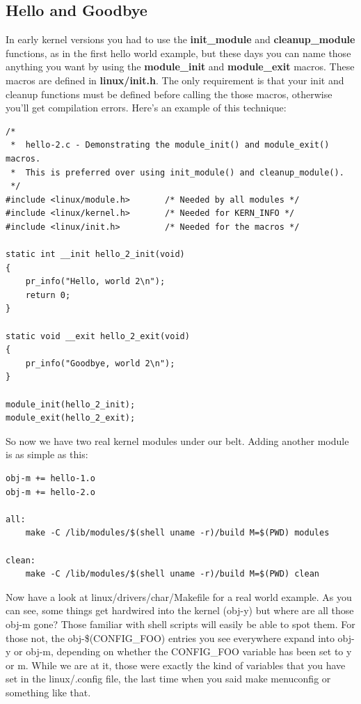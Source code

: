 \documentclass[11pt]{article}
\begin{document}
\subsection*{Hello and Goodbye}
\label{sec-4-2}
In early kernel versions you had to use the \textbf{init\_module} and \textbf{cleanup\_module} functions, as in the first hello world example, but these days you can name those anything you want by using the \textbf{module\_init} and \textbf{module\_exit} macros. These macros are defined in \textbf{linux/init.h}. The only requirement is that your init and cleanup functions must be defined before calling the those macros, otherwise you'll get compilation errors. Here's an example of this technique:

\begin{verbatim}
/*
 *  hello-2.c - Demonstrating the module_init() and module_exit() macros.
 *  This is preferred over using init_module() and cleanup_module().
 */
#include <linux/module.h>       /* Needed by all modules */
#include <linux/kernel.h>       /* Needed for KERN_INFO */
#include <linux/init.h>         /* Needed for the macros */

static int __init hello_2_init(void)
{
    pr_info("Hello, world 2\n");
    return 0;
}

static void __exit hello_2_exit(void)
{
    pr_info("Goodbye, world 2\n");
}

module_init(hello_2_init);
module_exit(hello_2_exit);
\end{verbatim}

So now we have two real kernel modules under our belt. Adding another module is as simple as this:

\begin{verbatim}
obj-m += hello-1.o
obj-m += hello-2.o

all:
    make -C /lib/modules/$(shell uname -r)/build M=$(PWD) modules

clean:
    make -C /lib/modules/$(shell uname -r)/build M=$(PWD) clean
\end{verbatim}

Now have a look at linux/drivers/char/Makefile for a real world example. As you can see, some things get hardwired into the kernel (obj-y) but where are all those obj-m gone? Those familiar with shell scripts will easily be able to spot them. For those not, the obj-\$(CONFIG\_FOO) entries you see everywhere expand into obj-y or obj-m, depending on whether the CONFIG\_FOO variable has been set to y or m. While we are at it, those were exactly the kind of variables that you have set in the linux/.config file, the last time when you said make menuconfig or something like that.
\end{document}
